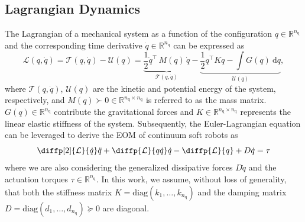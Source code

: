 \subsection{Lagrangian Dynamics}\label{sub:pcsregression:lagr_dynamics}
The Lagrangian of a mechanical system as a function of the configuration $q \in \mathbb{R}^{n_\mathrm{q}}$ and the corresponding time derivative $\dot{q} \in \mathbb{R}^{n_\mathrm{q}}$ can be expressed as
\begin{equation}
    \mathcal{L}(q, \dot{q}) = \mathcal{T}(q, \dot{q}) - \mathcal{U}(q) = \underbrace{\frac{1}{2}\dot{q}^\top \, M(q) \, \dot{q}}_{\mathcal{T}(q, \dot{q})} - \underbrace{\frac{1}{2} q^\top K q - \int G(q) \: \mathrm{d}q}_{\mathcal{U}(q)},
\end{equation}
where $\mathcal{T}(q, \dot{q})$, $\mathcal{U}(q)$ are the kinetic and potential energy of the system, respectively, and $M(q) \succ 0 \in \mathbb{R}^{n_\mathrm{q} \times n_\mathrm{q}}$ is referred to as the mass matrix. $G(q) \in \mathbb{R}^{n_\mathrm{q}}$ contribute the gravitational forces and $K \in \mathbb{R}^{n_\mathrm{q} \times n_\mathrm{q}}$ represents the linear elastic stiffness of the system.
Subsequently, the Euler-Lagrangian equation can be leveraged to derive the \gls{EOM} of continuum soft robots as~\citep{della2023model, liu2024physics}
\begin{equation}
    \diffp[2]{\mathcal{L}}{{\dot{q}}}\ddot{q} + \diffp{\mathcal{L}}{{q}{\dot{q}}}\dot{q} - \diffp{\mathcal{L}}{{q}} + D\dot{q} = \tau
\end{equation}
where we are also considering the generalized dissipative forces $D\dot{q}$ and the actuation torques $\tau \in \mathbb{R}^{n_\mathrm{q}}$. 
In this work, we assume, without loss of generality, that both the stiffness matrix $K = \mathrm{diag}(k_1, \dots, k_{n_\mathrm{q}})$ and the damping matrix $D = \mathrm{diag}(d_1, \dots, d_{n_\mathrm{q}}) \succeq 0$ are diagonal.

